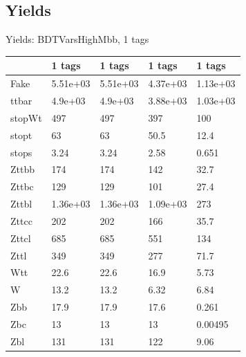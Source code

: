 
\subsection{Yields}

\begin{frame}{Yields: BDTVarsHighMbb, 1 tags}
\begin{center}
  \begin{tabular}{l| >{\centering\let\newline\\\arraybackslash\hspace{0pt}}m{1.4cm}| >{\centering\let\newline\\\arraybackslash\hspace{0pt}}m{1.4cm}| >{\centering\let\newline\\\arraybackslash\hspace{0pt}}m{1.4cm}| >{\centering\let\newline\\\arraybackslash\hspace{0pt}}m{1.4cm}}
    & 1 tags & 1 tags & 1 tags & 1 tags \\
 \hline \hline
    Fake& 5.51e+03 & 5.51e+03 & 4.37e+03 & 1.13e+03 \\
 \hline
    ttbar& 4.9e+03 & 4.9e+03 & 3.88e+03 & 1.03e+03 \\
 \hline
    stopWt& 497 & 497 & 397 & 100 \\
 \hline
    stopt& 63 & 63 & 50.5 & 12.4 \\
 \hline
    stops& 3.24 & 3.24 & 2.58 & 0.651 \\
 \hline
    Zttbb& 174 & 174 & 142 & 32.7 \\
 \hline
    Zttbc& 129 & 129 & 101 & 27.4 \\
 \hline
    Zttbl& 1.36e+03 & 1.36e+03 & 1.09e+03 & 273 \\
 \hline
    Zttcc& 202 & 202 & 166 & 35.7 \\
 \hline
    Zttcl& 685 & 685 & 551 & 134 \\
 \hline
    Zttl& 349 & 349 & 277 & 71.7 \\
 \hline
    Wtt& 22.6 & 22.6 & 16.9 & 5.73 \\
 \hline
    W& 13.2 & 13.2 & 6.32 & 6.84 \\
 \hline
    Zbb& 17.9 & 17.9 & 17.6 & 0.261 \\
 \hline
    Zbc& 13 & 13 & 13 & 0.00495 \\
 \hline
    Zbl& 131 & 131 & 122 & 9.06 \\

\end{tabular}
\end{center}
\end{frame}

